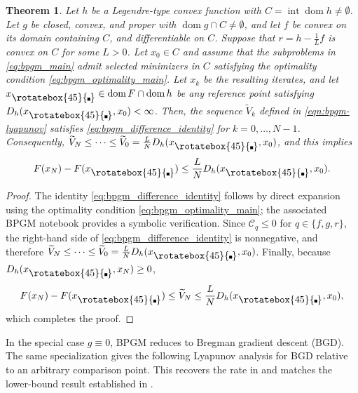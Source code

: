 \documentclass{article}
\theoremstyle{definition}
\theoremstyle{plain}
\newtheorem{theorem}{Theorem}
\newcommand{\cC}{{\mathcal{C}}}
\newcommand{\compidx}{%
  \mathord{\mathchoice
    {\vcenter{\hbox{\rotatebox{45}{\rule{0.39em}{0.39em}}}}}
    {\vcenter{\hbox{\rotatebox{45}{\rule{0.39em}{0.39em}}}}}
    {\vcenter{\hbox{\rotatebox{45}{\rule{0.29em}{0.29em}}}}}
    {\vcenter{\hbox{\rotatebox{45}{\rule{0.23em}{0.23em}}}}}}%
}
\newcommand{\bregsm}{f}
\newcommand{\bregprox}{g}
\newcommand{\bregaux}{r}
\begin{document}
\begin{theorem}
\label{theorem:bpgm-lyapunov}
Let $h$ be a Legendre-type convex function with $C=\operatorname{int}\operatorname{dom}h\neq\emptyset$.
Let $\bregprox$ be closed, convex, and proper with $\operatorname{dom}\bregprox\cap C\neq\emptyset$, and let $\bregsm$ be convex on its domain containing $C$, and differentiable on $C$.
Suppose that $\bregaux=h-\frac{1}{L}\bregsm$ is convex on $C$ for some $L>0$.
Let $x_0 \in C$ and assume that the subproblems in \eqref{eq:bpgm_main} admit selected minimizers in $C$ satisfying the optimality condition \eqref{eq:bpgm_optimality_main}.
Let $x_k$ be the resulting iterates, and let $x_{\compidx}\in\operatorname{dom}F\cap\operatorname{dom}h$ be any reference point satisfying $D_h(x_{\compidx},x_0)<\infty$.
Then, the sequence $\widetilde V_k$ defined in \eqref{eqn:bpgm-lyapunov} satisfies \eqref{eq:bpgm_difference_identity} for $k=0,\dots,N-1$.
Consequently, $\widetilde V_N\le\cdots\le \widetilde V_0=\frac{L}{N}D_h(x_{\compidx},x_0)$, and this implies
\[
    F(x_N)-F(x_{\compidx})\le \frac{L}{N}D_h(x_{\compidx},x_0).
\]
\end{theorem}

\begin{proof}
The identity \eqref{eq:bpgm_difference_identity} follows by direct expansion using the optimality condition \eqref{eq:bpgm_optimality_main}; the associated BPGM notebook  provides a symbolic verification.
Since $\cC_q \le 0$ for $q\in \{\bregsm,\bregprox,\bregaux\}$, the right-hand side of \eqref{eq:bpgm_difference_identity} is nonnegative, and therefore $\widetilde V_N\le\cdots\le \widetilde V_0=\frac{L}{N}D_h(x_{\compidx},x_0)$.
Finally, because $D_h(x_{\compidx}, x_N) \ge 0$,
\[
    F(x_N)-F(x_{\compidx}) \le \widetilde V_N \le \frac{L}{N}D_h(x_{\compidx},x_0) ,
\]
which completes the proof.
\end{proof}

In the special case $\bregprox\equiv0$, BPGM reduces to Bregman gradient descent (BGD). 
The same specialization gives the following Lyapunov analysis for BGD relative to an arbitrary comparison point. 
This recovers the rate in \cite{LuFreundNesterov2018_relatively} and matches the lower-bound result established in \cite{dragomirOptimalComplexityCertification2022}.
\end{document}
